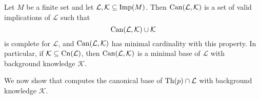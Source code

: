 \begin{Corollary}
  \label{cor:canonical-base-for-implications}
  Let $M$ be a finite set and let $\mathcal{L}, \mathcal{K} \subseteq \operatorname{Imp}(M)$.  Then
  $\operatorname{Can}(\mathcal{L}, \mathcal{K})$ is a set of valid implications of $\mathcal{L}$ such
  that
  \begin{equation*}
    \operatorname{Can}(\mathcal{L}, \mathcal{K}) \cup \mathcal{K}
  \end{equation*}
  is complete for $\mathcal{L}$, and $\operatorname{Can}(\mathcal{L}, \mathcal{K})$ has minimal
  cardinality with this property.  In particular, if $\mathcal{K} \subseteq
  \operatorname{Cn}(\mathcal{L})$, then $\operatorname{Can}(\mathcal{L}, \mathcal{K})$ is a minimal base of
  $\mathcal{L}$ with background knowledge $\mathcal{K}$.
\end{Corollary}

We now show that  computes the canonical base of $\operatorname{Th}(p)
\cap \mathcal{L}$ with background knowledge $\mathcal{K}$.

